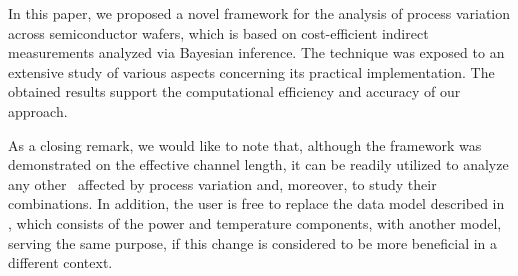 In this paper, we proposed a novel framework for the analysis of process variation across semiconductor wafers, which is based on cost-efficient indirect measurements analyzed via Bayesian inference.
The technique was exposed to an extensive study of various aspects concerning its practical implementation.
The obtained results support the computational efficiency and accuracy of our approach.

As a closing remark, we would like to note that, although the framework was demonstrated on the effective channel length, it can be readily utilized to analyze any other \qois\ affected by process variation and, moreover, to study their combinations.
In addition, the user is free to replace the data model described in , which consists of the power and temperature components, with another model, serving the same purpose, if this change is considered to be more beneficial in a different context.
